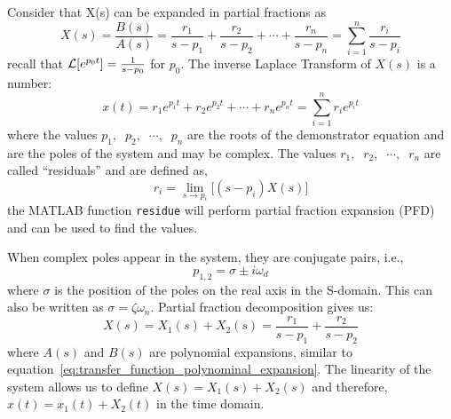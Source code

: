\documentclass[12pt,letter]{article}
\begin{document}
Consider that X(s) can be expanded in partial fractions as
\begin{equation}
X(s) = \frac{B(s)}{A(s)} = \frac{r_1}{s-p_1} + \frac{r_2}{s-p_2} + \cdots + \frac{r_n}{s-p_n} = \sum_{i=1}^{n}  \frac{r_i}{s-p_i}
\end{equation}
recall that $\mathcal{L}{\left[e^{p_0t}\right]} =  \frac{1}{s-p_0}$ for $p_0$. The inverse Laplace Transform of $X(s)$ is a number:
\begin{equation}
x(t) = r_1 e^{p_1 t} + r_2 e^{p_2 t}  + \cdots + r_n e^{p_n t}  = \sum_{i=1}^{n}  r_i e^{p_i t}
\end{equation}
where the values $p_1, \;\; p_2, \;\; \cdots, \;\;  p_n$ are the roots of the demonstrator equation and are the poles of the system and may be complex. The values $r_1, \;\; r_2, \;\; \cdots, \;\;  r_n$ are called ``residuals'' and are defined as,
\begin{equation}
r_i = \lim\limits_{s \rightarrow p_i} \big[(s-p_i)X(s) \big]
\end{equation}
the MATLAB function \texttt{residue} will perform partial fraction expansion (PFD) and can be used to find the values. 

When complex poles appear in the system, they are conjugate pairs, i.e., 
\begin{equation}
p_{1,2} = \sigma \pm i \omega_d
\end{equation}
where $\sigma$ is the position of the poles on the real axis in the S-domain. This can also be written as $\sigma = \zeta \omega_n$. Partial fraction decomposition gives us:
\begin{equation}
X(s) = X_1(s) + X_2(s) = \frac{r_1}{s-p_1} + \frac{r_2}{s-p_2}
\label{eq:linear_X_s_with_residuales}
\end{equation}
where $A(s)$ and $B(s)$ are polynomial expansions, similar to equation~\ref{eq:transfer_function_polynominal_expansion}. The linearity of the system allows us to define $X(s) = X_1(s) + X_2(s)$ and therefore, $x(t) = x_1(t) + X_2(t)$ in the time domain. 
\end{document}
